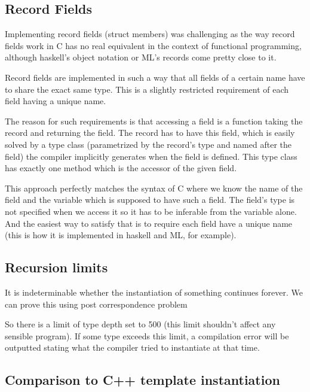 
\subsection{Record Fields}

Implementing record fields (struct members) was challenging as the way record fields work in C has no real equivalent in the context of functional programming, although haskell's object notation or ML's records come pretty close to it. %

Record fields are implemented in such a way that all fields of a certain name have to share the exact same type. This is a slightly restricted requirement of each field having a unique name.

The reason for such requirements is that accessing a field is a function taking the record and returning the field. The record has to have this field, which is easily solved by a type class (parametrized by the record's type and named after the field) the compiler implicitly generates when the field is defined. This type class has exactly one method which is the accessor of the given field.

This approach perfectly matches the syntax of C where we know the name of the field and the variable which is supposed to have such a field. The field's type is not specified when we access it so it has to be inferable from the variable alone. And the easiest way to satisfy that is to require each field have a unique name (this is how it is implemented in haskell and ML, for example).

\subsection{Recursion limits}

It is indeterminable whether the instantiation of something continues forever. We can prove this using post correspondence problem %

So there is a limit of type depth set to 500 (this limit shouldn't affect any sensible program).
If some type exceeds this limit, a compilation error will be outputted stating what the compiler tried to instantiate at that time.

\subsection{Comparison to C++ template instantiation}

